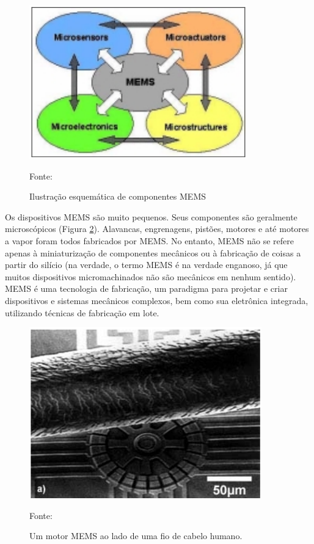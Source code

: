 		\begin{figure}[h]
			\centering
			\includegraphics[keepaspectratio=true,scale=0.5
			]{figuras/esquematico_mems.png}
			\caption{Ilustração esquemática de componentes MEMS}
			Fonte: \cite{prime2002}
			\label{esquematico_mems}
		\end{figure}

		Os dispositivos MEMS são muito pequenos. Seus componentes são geralmente microscópicos (Figura \ref{escala_mems}). Alavancas, engrenagens, pistões, motores e até motores a vapor foram todos fabricados por MEMS. No entanto, MEMS não se refere apenas à miniaturização de componentes mecânicos ou à fabricação de coisas a partir do silício (na verdade, o termo MEMS é na verdade enganoso, já que muitos dispositivos micromachinados não são mecânicos em nenhum sentido). MEMS é uma tecnologia de fabricação, um paradigma para projetar e criar dispositivos e sistemas mecânicos complexos, bem como sua eletrônica integrada, utilizando técnicas de fabricação em lote\cite{prime2002}.

		\begin{figure}[h]
			\centering
			\includegraphics[keepaspectratio=true,scale=0.5
			]{figuras/escala_mems.png}
			\caption{Um motor MEMS ao lado de uma fio de cabelo humano.}
			Fonte: \cite{prime2002}
			\label{escala_mems}
		\end{figure}


